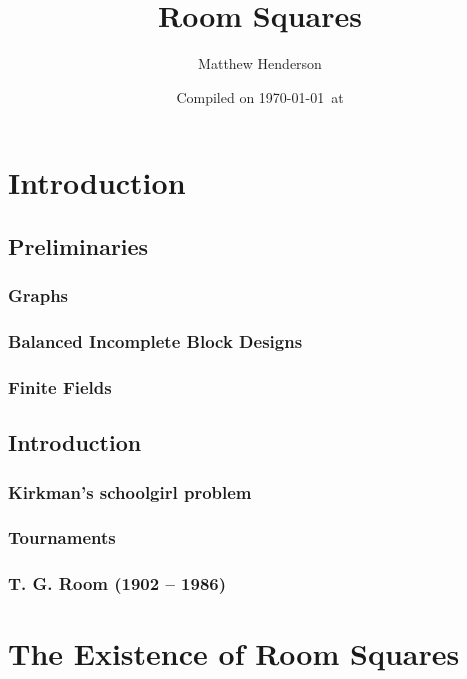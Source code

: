 \documentclass[a4paper, draft]{book}
\title{Room Squares}
\author{Matthew Henderson}
\date{Compiled on \today\ at \currenttime}
\begin{document}
\frontmatter
\maketitle
\tableofcontents

\mainmatter

\part{Introduction}

\chapter{Preliminaries}
  \label{ch:preliminaries}
  \section{Graphs}
    \label{sec:graph}
    
  \section{Balanced Incomplete Block Designs}
    \label{sec:bibd}
    
  \section{Finite Fields}
    \label{sec:galois-field}
    

\chapter{Introduction}
  \label{ch:introduction}
  \section{Kirkman’s schoolgirl problem}
    
  \section{Tournaments}
    
  \section{T. G. Room (1902 -- 1986)}
    

\part{The Existence of Room Squares}
\end{document}
